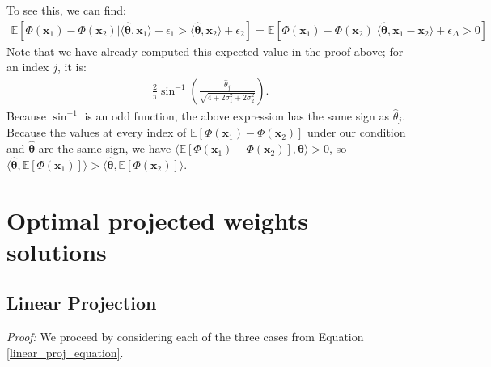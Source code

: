 \documentclass{article} %
\begin{document}
To see this, we can find:
\begin{align*}
\mathbb{E}[\Phi(\mathbf{x}_1)-\Phi(\mathbf{x}_2)|\langle\hat{\bm{\theta}},\mathbf{x}_1\rangle + \epsilon_1 > \langle\hat{\bm{\theta}},\mathbf{x}_2\rangle + \epsilon_2]
= \mathbb{E}[\Phi(\mathbf{x}_1)-\Phi(\mathbf{x}_2)|\langle\hat{\bm{\theta}},\mathbf{x}_1-\mathbf{x}_2\rangle + \epsilon_\Delta > 0]
\end{align*}
Note that we have already computed this expected value in the proof above; for an index $j$, it is:
\begin{align*}
\frac{2}{\pi}\sin^{-1}\left(\frac{\hat{\theta}_j}{\sqrt{4+2\sigma^2_1 + 2\sigma^2_2}}\right).
\end{align*}
Because $\sin^{-1}$ is an odd function, the above expression has the same sign as $\hat{\theta}_j$. Because the values at every index of $\mathbb{E}[\Phi(\mathbf{x}_1)-\Phi(\mathbf{x}_2)]$ under our condition and $\hat{\bm{\theta}}$ are the same sign, we have $\langle\mathbb{E}[\Phi(\mathbf{x}_1)-\Phi(\mathbf{x}_2)], \hat{\bm{\theta}}\rangle > 0$, so $\langle\hat{\bm{\theta}},\mathbb{E}[\Phi(\mathbf{x}_1)]\rangle > 
\langle\hat{\bm{\theta}},\mathbb{E}[\Phi(\mathbf{x}_2)]\rangle$.

\section{Optimal projected weights solutions}
\label{projection_proof}

\subsection{Linear Projection}
\linearproj*

\textit{Proof:} We proceed by considering each of the three cases from Equation \ref{linear_proj_equation}.
\end{document}
